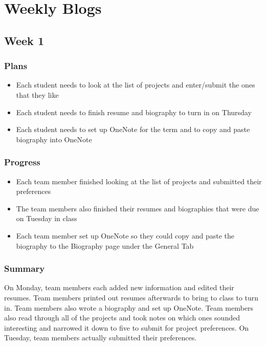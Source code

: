 \documentclass[onecolumn, draftclsnofoot,10pt, compsoc]{IEEEtran}
\begin{document}
\section{Weekly Blogs}

\subsection{Week 1}

\subsubsection{Plans}
\begin{itemize}
\item Each student needs to look at the list of projects and enter/submit the ones that they like
\item Each student needs to finish resume and biography to turn in on Thursday
\item Each student needs to set up OneNote for the term and to copy and paste biography into OneNote
\end{itemize}

\subsubsection{Progress}
\begin{itemize}
\item Each team member finished looking at the list of projects and submitted their preferences
\item The team members also finished their resumes and biographies that were due on Tuesday in class 
\item Each team member set up OneNote so they could copy and paste the biography to the Biography page under the General Tab
\end{itemize}

\subsubsection{Summary}
On Monday, team members each added new information and edited their resumes. Team members printed out resumes afterwards to bring to class to turn in. Team members also wrote a biography and set up OneNote. Team members also read through all of the projects and took notes on which ones sounded interesting and narrowed it down to five to submit for project preferences. On Tuesday, team members  actually submitted their preferences.
\end{document}
